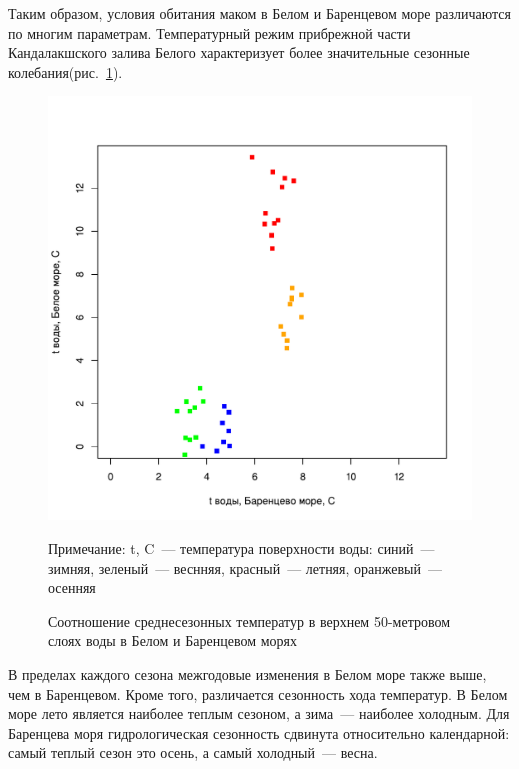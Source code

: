 \vspace{2cm}

Таким образом, условия обитания маком в Белом и Баренцевом море различаются по многим параметрам.
Температурный режим прибрежной части Кандалакшского залива Белого характеризует более значительные сезонные колебания(рис.~\ref{ris:temp_White_Barents}).
	\begin{figure}[p]
    \includegraphics[width=\textwidth]{../temperatures_water_air/temp_White_Barents1.pdf}
    \caption{Соотношение среднесезонных температур в верхнем 50-метровом слоях воды в Белом и Баренцевом морях}

{\footnotesize Примечание: t, C~--- температура поверхности воды: синий~--- зимняя, зеленый~--- веснняя, красный~--- летняя, оранжевый~--- осенняя}
    \label{ris:temp_White_Barents}
	\end{figure}
В пределах каждого сезона межгодовые изменения в Белом море также выше, чем в Баренцевом.
Кроме того, различается сезонность хода температур. 
В Белом море лето является наиболее теплым сезоном, а зима~--- наиболее холодным.
Для Баренцева моря гидрологическая сезонность сдвинута относительно календарной: самый теплый сезон это осень, а самый холодный~--- весна.

